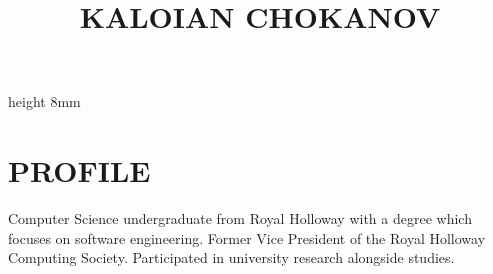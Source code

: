 \documentclass{CVClass}
\begin{document}
\begin{minipage}[t][4cm]{0.70\textwidth} 
    \title[Software Engineer]{KALOIAN CHOKANOV}
\end{minipage}
\quad
\vline height 8mm 
\quad
\begin{minipage}[t][4cm]{0.30\textwidth}
    \address{   %
        404 Monastery Street,\\
        Geo Milev,\\
        Sofia,\\
        1111
        }
\end{minipage}
\vskip2mm

\begin{minipage}[t]{0.75\textwidth}
    \section{PROFILE}{
		\raggedright
		Computer Science undergraduate from Royal Holloway with a degree which focuses on software engineering. Former Vice President of the Royal Holloway Computing Society. Participated in university research alongside studies.
	}
\end{minipage}
\end{document}
